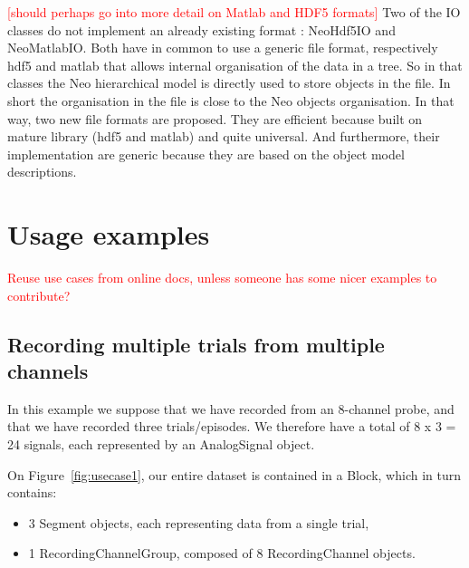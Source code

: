 \documentclass{frontiers}
\newcommand{\missing}[1]{\textcolor{red}{#1}}
\begin{document}
\missing{[should perhaps go into more detail on Matlab and HDF5 formats]}
Two of the IO classes do not implement an already existing format : NeoHdf5IO and NeoMatlabIO. Both have in common to use a generic file format, respectively hdf5 and matlab that allows internal organisation of the data in a tree. So in that classes the Neo hierarchical model is directly used to store objects in the file. In short the organisation in the file is close to the Neo objects organisation. In that way, two new file formats are proposed. They are efficient because built on mature library (hdf5 and matlab) and quite universal. And furthermore, their implementation are generic because they are based on the object model descriptions.



\section{Usage examples}

\missing{Reuse use cases from online docs, unless someone has some nicer examples to contribute?}


\subsection{Recording multiple trials from multiple channels}


In this example we suppose that we have recorded from an 8-channel probe, and that we have recorded three trials/episodes. We therefore have a total of 8 x 3 = 24 signals, each represented by an AnalogSignal object.

On Figure~\ref{fig:usecase1}, our entire dataset is contained in a Block, which in turn contains:
\begin{itemize}
\item 3 Segment objects, each representing data from a single trial,
\item 1 RecordingChannelGroup, composed of 8 RecordingChannel objects.
\end{itemize}
\end{document}
